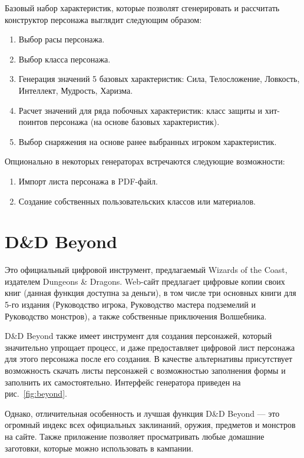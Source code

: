 Базовый набор характеристик, которые позволят сгенерировать и рассчитать конструктор персонажа выглядит следующим образом:

\begin{enumerate}
    \item Выбор расы персонажа.
    \item Выбор класса персонажа.
    \item Генерация значений 5 базовых характеристик: Сила, Телосложение, Ловкость, Интеллект, Мудрость, Харизма.
    \item Расчет значений для ряда побочных характеристик: класс защиты и хит-поинтов персонажа (на основе базовых характеристик).
    \item Выбор снаряжения на основе ранее выбранных игроком характеристик.
\end{enumerate}

Опционально в некоторых генераторах встречаются следующие возможности:

\begin{enumerate}
    \item Импорт листа персонажа в PDF-файл.
    \item Создание собственных пользовательских классов или материалов.
\end{enumerate}

\section{D\&D Beyond}

Это официальный цифровой инструмент, предлагаемый Wizards of the Coast, издателем Dungeons \& Dragons. Web-сайт предлагает цифровые копии своих книг (данная функция доступна за деньги), в том числе три основных книги для 5-го издания (Руководство игрока, Руководство мастера подземелий и Руководство монстров), а также собственные приключения Волшебника.

D\&D Beyond также имеет инструмент для создания персонажей, который значительно упрощает процесс, и даже предоставляет цифровой лист персонажа для этого персонажа после его создания. В качестве альтернативы присутствует возможность скачать листы персонажей с возможностью заполнения формы и заполнить их самостоятельно. Интерфейс генератора приведен на рис.~\ref{fig:beyond}.

Однако, отличительная особенность и лучшая функция D\&D Beyond --- это огромный индекс всех официальных заклинаний, оружия, предметов и монстров на сайте. Также приложение позволяет просматривать любые домашние заготовки, которые можно использовать в кампании.

